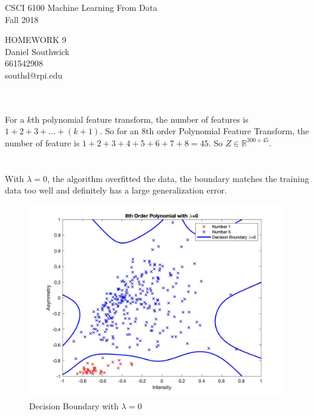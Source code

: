 \documentclass[12pt]{article}
\begin{document}
\begin{center}
CSCI 6100 Machine Learning From Data\\
Fall 2018\\
\end{center}
\begin{center}
HOMEWORK 9\\
Daniel Southwick\\
661542908\\
southd@rpi.edu
\end{center}
\vspace{.1in}

 \\\\
\indent For a $k$th polynomial feature transform, the number of features is $1 + 2 + 3 + ... + (k+1)$. So for an 8th order Polynomial Feature Transform, the number of feature is $1 + 2 + 3 + 4 + 5 + 6 + 7 + 8 = 45$. So $Z \in \mathbb{R}^{300 \times 45}$. \\

 \\\\
\indent With $\lambda = 0$, the algorithm overfitted the data, the boundary matches the training data too well and definitely has a large generalization error.
\begin{figure}[H]
  \centering
  \includegraphics[scale = 0.3]{1.jpg}
  \caption{Decision Boundary with $\lambda = 0$}
  \label{fig:1}
\end{figure}
\end{document}
